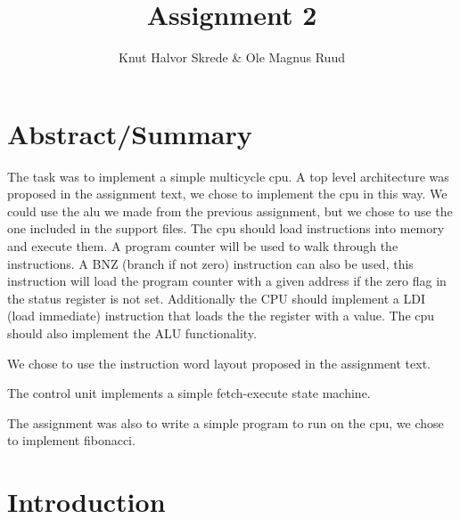 \documentclass[10pt]{report}
\title{Assignment 2}
\author{Knut Halvor Skrede \& Ole Magnus Ruud}
\begin{document}
\maketitle
\clearpage


\section*{Abstract/Summary}
        

The task was to implement a simple multicycle cpu. A top level architecture 
was proposed in the assignment text, we chose to implement the cpu in this way. 
We could use the alu we made from the previous assignment, but we chose to use
the one included in the support files. The cpu should load instructions into 
memory and execute them. A program counter will be used to walk through the 
instructions. A BNZ (branch if not zero) instruction can also be used, this 
instruction will load the program counter with a given address if the zero flag
in the status register is not set. Additionally the CPU should implement a 
LDI (load immediate) instruction that loads the the register with a value. 
The cpu should also implement the ALU functionality.

We chose to use the instruction word layout proposed in the assignment text.

The control unit implements a simple fetch-execute state machine.

The assignment was also to write a simple program to run on the cpu, 
we chose to implement fibonacci.

\section*{Introduction}

\end{document}
